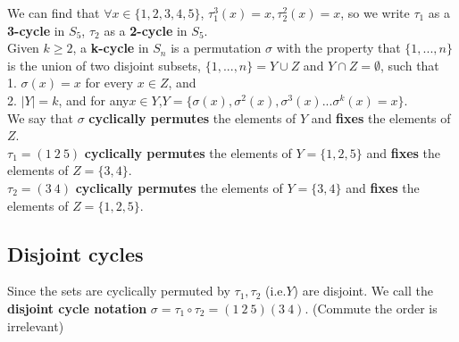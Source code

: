 \documentclass[11pt,a4paper]{article}
\begin{document}
We can find that $\forall x\in \{1,2,3,4,5\}$, $\tau_1^{3}(x)=x, \tau_2^{2}(x)=x$, so we write $\tau_1$ as a \textbf{3-cycle} in $S_5$, $\tau_2$ as a \textbf{2-cycle} in $S_5$.\\

Given $k \geq 2$, a \textbf{k-cycle} in $S_n$ is a permutation $\sigma$ with the property that $\{1,...,n\}$ is the union of two disjoint subsets, $\{1,...,n\}=Y \cup Z $ and $Y \cap Z =\emptyset$, such that\\
1. $\sigma(x) = x$ for every $x \in Z$, and\\
2. $|Y| = k$, and for any$ x \in Y$,$Y = \{\sigma (x), \sigma^2(x), \sigma^3(x)... \sigma^k(x) = x\}$.\\

We say that $\sigma$ \textbf{cyclically permutes} the elements of $Y$ and \textbf{fixes} the elements of $Z$.\\
$\tau_1=(1\ 2\ 5)$ \textbf{cyclically permutes} the elements of $Y=\{1,2,5\}$ and \textbf{fixes} the elements of $Z=\{3,4\}$.\\
$\tau_2=(3\ 4)$ \textbf{cyclically permutes} the elements of $Y=\{3,4\}$ and \textbf{fixes} the elements of $Z=\{1,2,5\}$.\\


\subsection{Disjoint cycles}
Since the sets are cyclically permuted by $\tau_1, \tau_2$ (i.e.$Y$) are disjoint. We call the \textbf{disjoint cycle notation} $\sigma=\tau_1\circ\tau_2=(1\ 2\ 5)(3\ 4)$. (Commute the order is irrelevant)
\end{document}

